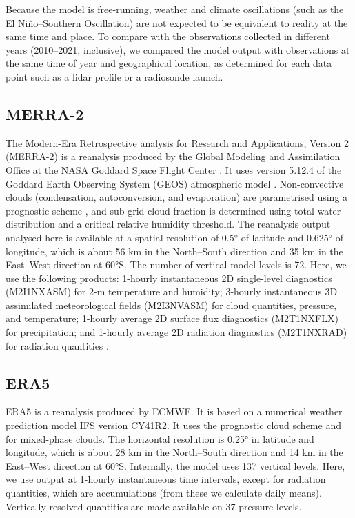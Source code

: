 \documentclass[12pt,a4paper]{article}
\begin{document}
Because the model is free-running, weather and climate oscillations (such as
the El Niño--Southern Oscillation) are not expected to be equivalent to reality
at the same time and place. To compare with the observations collected in
different years (2010--2021, inclusive), we compared the model output with
observations at the same time of year and geographical location, as determined
for each data point such as a lidar profile or a radiosonde launch.

\subsection{MERRA-2}

The Modern-Era Retrospective analysis for Research and Applications, Version 2
(MERRA-2) is a reanalysis produced by the Global Modeling and Assimilation
Office at the NASA Goddard Space Flight Center \citep{gelaro2017}.  It uses
version 5.12.4 of the Goddard Earth Observing System (GEOS) atmospheric model
\citep{rienecker2008,molod2015}. Non-convective clouds (condensation,
autoconversion, and evaporation) are parametrised using a prognostic scheme
\citep{bacmeister2006}, and sub-grid cloud fraction is determined using total
water distribution and a critical relative humidity threshold. The reanalysis
output analysed here is available at a spatial resolution of 0.5° of latitude
and 0.625° of longitude, which is about 56 km in the North--South direction and
35 km in the East--West direction at 60°S. The number of vertical model levels
is 72. Here, we use the following products: 1-hourly instantaneous 2D
single-level diagnostics (M2I1NXASM) for 2-m temperature and humidity; 3-hourly
instantaneous 3D assimilated meteorological fields (M2I3NVASM) for cloud
quantities, pressure, and temperature; 1-hourly average 2D surface flux
diagnostics (M2T1NXFLX) for precipitation; and 1-hourly average 2D radiation
diagnostics (M2T1NXRAD) for radiation quantities \citep{merra2}.

\subsection{ERA5}

ERA5 \citep{era5} is a reanalysis produced by ECMWF.  It is based on a
numerical weather prediction model IFS version CY41R2. It uses the
\cite{tiedtke1993} prognostic cloud scheme and \cite{forbes2014} for
mixed-phase clouds. The horizontal resolution is 0.25° in latitude and
longitude, which is about 28 km in the North--South direction and 14 km in the
East--West direction at 60°S.  Internally, the model uses 137 vertical levels.
Here, we use output at 1-hourly instantaneous time intervals, except for
radiation quantities, which are accumulations (from these we calculate daily
means).  Vertically resolved quantities are made available on 37 pressure
levels.
\end{document}
